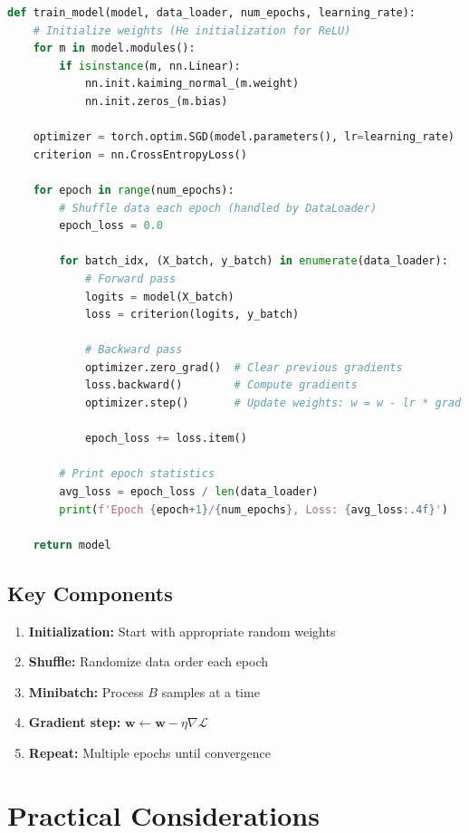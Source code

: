 \documentclass{article}
\begin{document}
\begin{lstlisting}[language=Python, caption=Minibatch SGD implementation]
def train_model(model, data_loader, num_epochs, learning_rate):
    # Initialize weights (He initialization for ReLU)
    for m in model.modules():
        if isinstance(m, nn.Linear):
            nn.init.kaiming_normal_(m.weight)
            nn.init.zeros_(m.bias)
    
    optimizer = torch.optim.SGD(model.parameters(), lr=learning_rate)
    criterion = nn.CrossEntropyLoss()
    
    for epoch in range(num_epochs):
        # Shuffle data each epoch (handled by DataLoader)
        epoch_loss = 0.0
        
        for batch_idx, (X_batch, y_batch) in enumerate(data_loader):
            # Forward pass
            logits = model(X_batch)
            loss = criterion(logits, y_batch)
            
            # Backward pass
            optimizer.zero_grad()  # Clear previous gradients
            loss.backward()        # Compute gradients
            optimizer.step()       # Update weights: w = w - lr * grad
            
            epoch_loss += loss.item()
        
        # Print epoch statistics
        avg_loss = epoch_loss / len(data_loader)
        print(f'Epoch {epoch+1}/{num_epochs}, Loss: {avg_loss:.4f}')
    
    return model
\end{lstlisting}

\subsection{Key Components}

\begin{enumerate}
\item \textbf{Initialization:} Start with appropriate random weights
\item \textbf{Shuffle:} Randomize data order each epoch
\item \textbf{Minibatch:} Process $B$ samples at a time
\item \textbf{Gradient step:} $\mathbf{w} \leftarrow \mathbf{w} - \eta \nabla \mathcal{L}$
\item \textbf{Repeat:} Multiple epochs until convergence
\end{enumerate}

\section{Practical Considerations}
\end{document}
